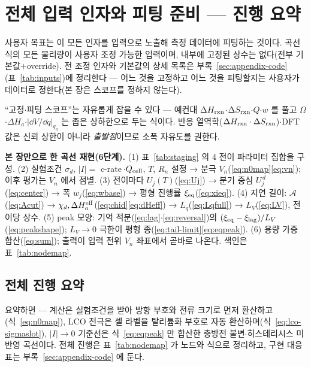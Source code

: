 \section{전체 입력 인자와 피팅 준비 --- 진행 요약}\label{sec:inputs}
사용자 목표는 이 모든 인자를 입력으로 노출해 측정 데이터에 피팅하는 것이다. 곡선식의 모든 물리량이 사용자
조정 가능한 입력이며, 내부에 고정된 상수는 없다(전부 기본값$+$override). 전 조정 인자와 기본값의 상세
목록은 부록~\ref{sec:appendix-code}(표~\ref{tab:inputs})에 정리한다 --- 어느 것을 고정하고 어느 것을
피팅할지는 사용자가 데이터로 정한다(본 장은 스코프를 정하지 않는다).

``고정$\cdot$피팅 스코프''는 자유롭게 잡을 수 있다 --- 예컨대
$\Delta H_{\mathrm{rxn}}$$\cdot$$\Delta S_{\mathrm{rxn}}$$\cdot$$Q$$\cdot$$w$ 를 풀고 $\Omega$$\cdot$$\Delta H_a$$\cdot$$|\dd V/\dd q|_{q_a}$
는 좁은 상하한으로 두는 식이다. 반응 열역학($\Delta H_{\mathrm{rxn}}\cdot\Delta S_{\mathrm{rxn}}$)$\cdot$DFT 값은 신뢰 상한이 아니라
\emph{출발점}이므로 소폭 자유도를 권한다.

\begin{keybox}
\textbf{본 장만으로 한 곡선 재현(6단계).}
(1) 표~\ref{tab:staging} 의 4 전이 파라미터 집합을 구성.
(2) 실험조건 $\sigma_d$, $|I|=$ c-rate$\,\cdot Q_{\mathrm{cell}}$, $T$, $R_n$ 설정 → 분극 $V_n$(\eqref{eq:n0map}\eqref{eq:vn}); 이후 평가는 $V_n$ 에서 점별.
(3) 전이마다 $U_j(T)$(\eqref{eq:Uj}) → 분기 중심 $U_j^{\,d}$(\eqref{eq:center}) → 폭 $w_j$(\eqref{eq:wbase}) → 평형 진행률 $\xi_{\mathrm{eq}}$(\eqref{eq:xieq}).
(4) 지연 길이: $\mathcal A$(\eqref{eq:Acut}) → $\chi_d,\Delta H_a^{\mathrm{eff}}$(\eqref{eq:chid}\eqref{eq:dHeff}) → $L_q$(\eqref{eq:Lqfull}) → $L_V$(\eqref{eq:LV}), 전이당 상수.
(5) peak 모양: 기억 적분(\eqref{eq:lag}$\cdot$\eqref{eq:reversal})의 $(\xi_{\mathrm{eq}}-\xi_\mathrm{lag})/L_V$(\eqref{eq:peakshape}); $L_V\to0$ 극한이 평형 종(\eqref{eq:tail-limit}\eqref{eq:eqpeak}).
(6) 용량 가중 합산(\eqref{eq:sum}); 출력이 입력 전위 $V_n$ 좌표에서 곧바로 나온다. 색인은 표~\ref{tab:nodemap}.
\end{keybox}

\subsection{전체 진행 요약}\label{sec:facade}
요약하면 --- 계산은 실험조건을 받아 방향 부호와 전류 크기로 먼저 환산하고(식~\eqref{eq:n0map}),
LCO 전극은 셀 라벨을 탈리튬화 부호로 자동 환산하며(식~\eqref{eq:lco-sigmaslot}), $|I|\to0$ 기준선은
식~\eqref{eq:eqpeak} 만 합산한 충방전 불변$\cdot$히스테리시스 미반영 곡선이다. 전체 진행은
표~\ref{tab:nodemap} 가 노드와 식으로 정리하고, 구현 대응표는
부록~\ref{sec:appendix-code} 에 둔다.

